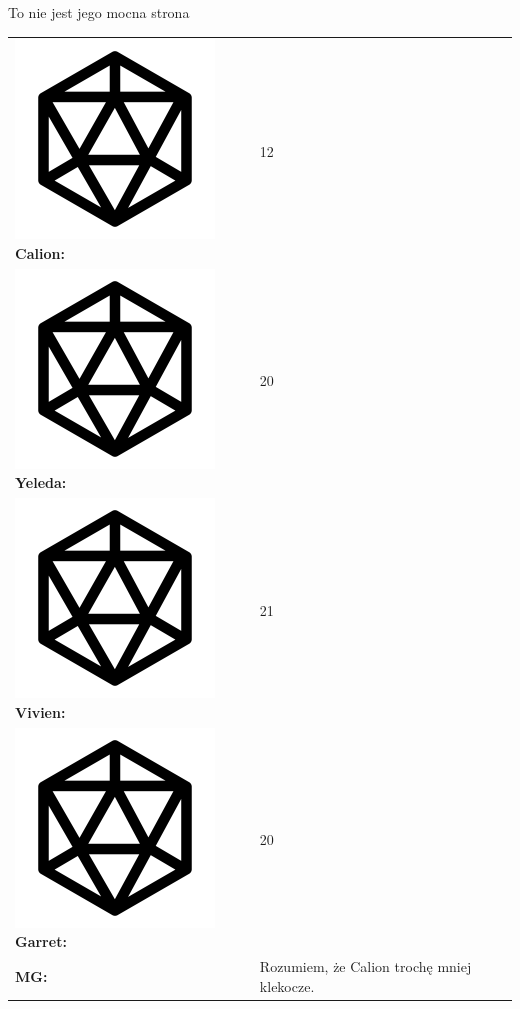 \documentclass[10pt,twoside,twocolumn]{book}
\begin{document}
\begin{rpg-quotebox}{To nie jest jego mocna strona}
   \begin{tabularx}{\columnwidth}{lX}
      \includegraphics[scale=0.06]{img/d20.png} \textbf{Calion:} & 12\\
      \includegraphics[scale=0.06]{img/d20.png} \textbf{Yeleda:} & 20\\
      \includegraphics[scale=0.06]{img/d20.png} \textbf{Vivien:} & 21\\
      \includegraphics[scale=0.06]{img/d20.png} \textbf{Garret:} & 20\\
      \textbf{MG:} & Rozumiem, że Calion trochę mniej klekocze.\\
   \end{tabularx}
\end{rpg-quotebox}
\end{document}
